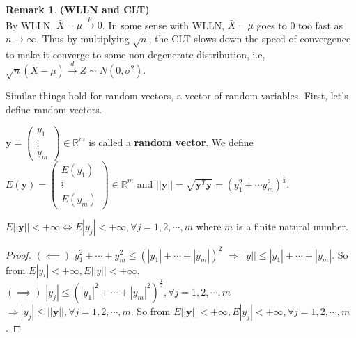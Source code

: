 \documentclass[11pt]{article} %
\theoremstyle{definition}
\numberwithin{defn}{subsection}
\numberwithin{thm}{subsection}
\newtheorem*{rmk}{Remark}
\numberwithin{ex}{subsection}
\newcommand{\bb}[1]{\mathbb{#1}}
\newcommand{\R}{\bb{R}}
\newcommand{\plim}{\overset{p}{\rightarrow}}
\newcommand{\dlim}{\overset{d}{\rightarrow}}
\newcommand{\ninfty}{n\rightarrow\infty}
\begin{document}
\begin{rmk}
	\textbf{(WLLN and CLT)}\\
	By WLLN, $\bar{X}-\mu\plim 0$. In some sense with WLLN, $\bar{X}-\mu$ goes to 0 too fast as $\ninfty$. Thus by multiplying $\sqrt{n}$, the CLT slows down the speed of convergence to make it converge to some non degenerate distribution, i.e, $\sqrt{n}(\bar{X}-\mu)\dlim Z\sim N(0,\sigma^2)$.
\end{rmk}



Similar things hold for random vectors, a vector of random variables. First, let's define random vectors.

\begin{defn}
	$\bm{y}=\begin{pmatrix}y_1\\\vdots\\y_m\end{pmatrix}\in\R^m$ is called a \textbf{random vector}. We define $E(\bm{y})=\begin{pmatrix}E(y_1)\\\vdots\\E(y_m)\end{pmatrix}\in\R^m$ and $||\bm{y}||=\sqrt{\bm{y}^T\bm{y}}=(y_1^2+\cdots y_m^2)^{\frac{1}{2}}$.
\end{defn}

\begin{thm}
	$E||\bm{y}||<+\infty\Leftrightarrow E|y_j|<+\infty,\forall j=1,2,\cdots,m$ where $m$ is a finite natural number.
	\begin{proof}
		$(\impliedby)$ $y_1^2+\cdots+y_m^2\le(|y_1|+\cdots+|y_m|)^2$ $\Rightarrow||y||\le|y_1|+\cdots+|y_m|$. So from $E|y_i|<+\infty,E||y||<+\infty$.\\
		$(\implies)$ $|y_j|\le(|y_1|^2+\cdots+|y_m|^2)^{\frac{1}{2}},\forall j=1,2,\cdots,m$ $\Rightarrow|y_j|\le||\bm{y}||,\forall j=1,2,\cdots,m$. So from $E||\bm{y}||<+\infty,E|y_j|<+\infty,\forall j=1,2,\cdots,m$.
	\end{proof}
\end{thm}
\end{document}
